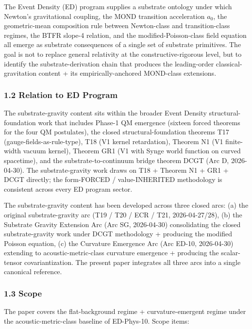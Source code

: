 \documentclass[
  11pt,a4paper]{article}
\begin{document}
The Event Density (ED) program supplies a substrate ontology under which
Newton's gravitational coupling, the MOND transition acceleration
\(a_0\), the geometric-mean composition rule between Newton-class and
transition-class regimes, the BTFR slope-4 relation, and the
modified-Poisson-class field equation all emerge as substrate
consequences of a single set of substrate primitives. The goal is not to
replace general relativity at the constructive-rigorous level, but to
identify the substrate-derivation chain that produces the leading-order
classical-gravitation content + its empirically-anchored MOND-class
extensions.

\subsubsection{1.2 Relation to ED Program}\label{relation-to-ed-program}

The substrate-gravity content sits within the broader Event Density
structural-foundation work that includes Phase-1 QM emergence (sixteen
forced theorems for the four QM postulates), the closed
structural-foundation theorems T17 (gauge-fields-as-rule-type), T18 (V1
kernel retardation), Theorem N1 (V1 finite-width vacuum kernel), Theorem
GR1 (V1 with Synge world function on curved spacetime), and the
substrate-to-continuum bridge theorem DCGT (Arc D, 2026-04-30). The
substrate-gravity work draws on T18 + Theorem N1 + GR1 + DCGT directly;
the form-FORCED / value-INHERITED methodology is consistent across every
ED program sector.

The substrate-gravity content has been developed across three closed
arcs: (a) the original substrate-gravity arc (T19 / T20 / ECR / T21,
2026-04-27/28), (b) the Substrate Gravity Extension Arc (Arc SG,
2026-04-30) consolidating the closed substrate-gravity work under DCGT
methodology + producing the modified Poisson equation, (c) the Curvature
Emergence Arc (Arc ED-10, 2026-04-30) extending to acoustic-metric-class
curvature emergence + producing the scalar-tensor covariantization. The
present paper integrates all three arcs into a single canonical
reference.

\subsubsection{1.3 Scope}\label{scope}

The paper covers the flat-background regime + curvature-emergent regime
under the acoustic-metric-class baseline of ED-Phys-10. Scope items:
\end{document}
